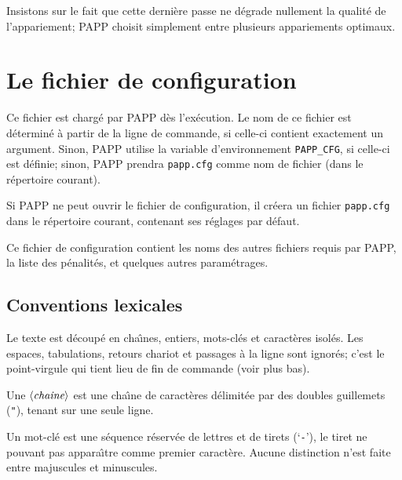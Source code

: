 \documentclass[10pt]{article}
\def\tthdump#1{#1}
\begin{document}
Insistons sur le fait que cette derni\`ere passe ne d\'egrade 
nullement la qualit\'e de l'appa\-rie\-ment; PAPP choisit simplement entre plusieurs 
appariements optimaux.

\section{Le fichier de configuration}

%
\def\gram#1{$\langle\hbox{\it#1}\rangle$}  
\def\opt#1{$[\hbox{\it#1}]$}     %
\def\optr#1{$\lbrace\hbox{\it#1}\rbrace$}
\def\fleche{$  \longrightarrow\,\,\,  $}
\def\ou{$\vert\,\tthdump{\,}$}
\def\vrb#1{{\tt #1}}	%

	Ce fichier est charg\'e par PAPP d\`es l'ex\'ecution.  Le nom
de ce fichier est d\'etermin\'e \`a partir de la ligne de commande, si
celle-ci contient exactement un argument.  Sinon, PAPP utilise la
variable d'environnement \verb|PAPP_CFG|, si celle-ci est d\'efinie;
sinon, PAPP prendra \verb|papp.cfg| comme nom de fichier (dans le
r\'epertoire courant).

	Si PAPP ne peut ouvrir le fichier de configuration, il
cr\'eera un fichier \verb|papp.cfg| dans le r\'epertoire courant,
contenant ses r\'eglages par d\'efaut.
 
	Ce fichier de configuration contient les noms des autres
fichiers requis par PAPP, la liste des p\'enalit\'es, et quelques
autres param\'etrages.
 
\subsection{Conventions lexicales}

	Le texte est d\'ecoup\'e en cha{\^\i}nes, entiers, mots-cl\'es
et caract\`eres isol\'es.  Les espaces, tabulations, retours chariot
et passages \`a la ligne sont ignor\'es; c'est le point-virgule qui
tient lieu de fin de commande (voir plus bas).

	Une \gram{chaine} est une cha{\^\i}ne de caract\`eres
d\'elimit\'ee par des doubles guillemets (\verb|"|), tenant sur une
seule ligne.

	Un mot-cl\'e est une s\'equence r\'eserv\'ee de lettres et de
tirets (`\verb|-|'), le tiret ne pouvant pas appara{\^\i}tre comme
premier caract\`ere.  Aucune distinction n'est faite entre majuscules
et minuscules.
\end{document}
